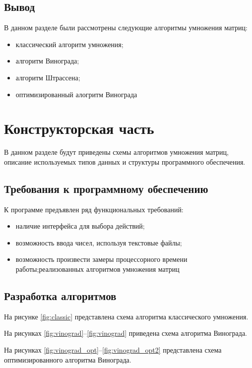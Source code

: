 \section*{Вывод}
В данном разделе были рассмотрены следующие алгоритмы умножения матриц: %
\begin{itemize}    
    \item классический алгоритм умножения;
    \item алгоритм Винограда;
    \item алгоритм Штрассена;        
    \item оптимизированный алогритм Винограда
\end{itemize}
\clearpage

\chapter{Конструкторская часть}
В данном разделе будут приведены схемы алгоритмов умножения матриц, описание используемых типов данных и структуры программного обеспечения.

\section{Требования к программному обеспечению}

К программе предъявлен ряд функциональных требований:

\begin{itemize}
    \item наличие интерфейса для выбора действий;
    \item возможность ввода чисел, используя текстовые файлы;
    \item возможность произвести замеры процессорного времени работы;реализованных алгоритмов умножения матриц
\end{itemize}

\section{Разработка алгоритмов}


На рисунке \ref{fig:classic} представлена схема алгоритма классического умножения.

На рисунках \ref{fig:vinograd}--\ref{fig:vinograd} приведена схема алгоритма Винограда.

На рисунках \ref{fig:vinograd_opt}--\ref{fig:vinograd_opt2} представлена схема оптимизированного алгоритма Винограда.


